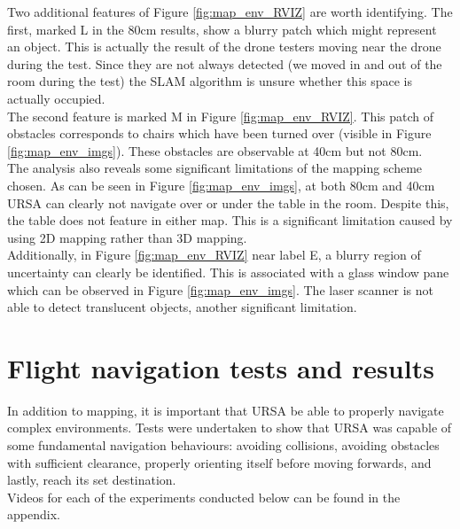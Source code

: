 \documentclass[capstone_report.tex]{subfiles}
\begin{document}
Two additional features of Figure \ref{fig:map_env_RVIZ} are worth identifying. The first, marked L in the 80cm results, show a blurry patch which might represent an object. This is actually the result of the drone testers moving near the drone during the test. Since they are not always detected (we moved in and out of the room during the test) the SLAM algorithm is unsure whether this space is actually occupied.\\

The second feature is marked M in Figure \ref{fig:map_env_RVIZ}. This patch of obstacles corresponds to chairs which have been turned over (visible in Figure \ref{fig:map_env_imgs}). These obstacles are observable at 40cm but not 80cm.\\

The analysis also reveals some significant limitations of the mapping scheme chosen. As can be seen in Figure \ref{fig:map_env_imgs}, at both 80cm and 40cm URSA can clearly not navigate over or under the table in the room. Despite this, the table does not feature in either map. This is a significant limitation caused by using 2D mapping rather than 3D mapping.\\

Additionally, in Figure \ref{fig:map_env_RVIZ} near label E, a blurry region of uncertainty can clearly be identified. This is associated with a glass window pane which can be observed in Figure \ref{fig:map_env_imgs}. The laser scanner is not able to detect translucent objects, another significant limitation.

\section{Flight navigation tests and results}
In addition to mapping, it is important that URSA be able to properly navigate complex environments. Tests were undertaken to show that URSA was capable of some fundamental navigation behaviours: avoiding collisions, avoiding obstacles with sufficient clearance, properly orienting itself before moving forwards, and lastly, reach its set destination.\\

Videos for each of the experiments conducted below can be found in the appendix.
\end{document}
